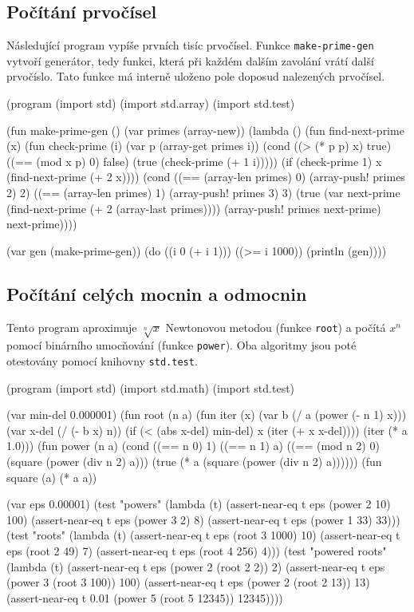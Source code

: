 \subsection{Počítání prvočísel}

Následující program vypíše prvních tisíc prvočísel. Funkce
\texttt{make-prime-gen} vytvoří generátor, tedy funkci, která při každém dalším
zavolání vrátí další prvočíslo. Tato funkce má interně uloženo pole doposud
nalezených prvočísel.

\begin{spiral}
(program
  (import std)
  (import std.array)
  (import std.test)

  (fun make-prime-gen ()
    (var primes (array-new))
    (lambda ()
      (fun find-next-prime (x)
        (fun check-prime (i)
          (var p (array-get primes i))
          (cond
            ((> (* p p) x) true)
            ((== (mod x p) 0) false)
            (true (check-prime (+ 1 i)))))
        (if (check-prime 1) x (find-next-prime (+ 2 x))))
      (cond
        ((== (array-len primes) 0)
          (array-push! primes 2) 2)
        ((== (array-len primes) 1)
          (array-push! primes 3) 3)
        (true 
          (var next-prime (find-next-prime (+ 2 (array-last primes))))
          (array-push! primes next-prime)
          next-prime))))

  (var gen (make-prime-gen))
  (do ((i 0 (+ i 1)))
    ((>= i 1000))
    (println (gen))))
\end{spiral}

\subsection{Počítání celých mocnin a odmocnin}

Tento program aproximuje $\sqrt[n]{x}$ Newtonovou metodou (funkce \texttt{root})
a počítá $x^n$ pomocí binárního umocňování (funkce \texttt{power}). Oba
algoritmy jsou poté otestovány pomocí knihovny \texttt{std.test}.

\begin{spiral}
(program
  (import std)
  (import std.math)
  (import std.test)

  (var min-del 0.000001)
  (fun root (n a)
    (fun iter (x)
      (var b (/ a (power (- n 1) x)))
      (var x-del (/ (- b x) n))
      (if (< (abs x-del) min-del) x (iter (+ x x-del))))
    (iter (* a 1.0)))
  (fun power (n a)
    (cond
      ((== n 0) 1)
      ((== n 1) a)
      ((== (mod n 2) 0) (square (power (div n 2) a)))
      (true (* a (square (power (div n 2) a))))))
  (fun square (a) (* a a))

  (var eps 0.00001)
  (test "powers" (lambda (t) 
    (assert-near-eq t eps (power 2 10) 100)
    (assert-near-eq t eps (power 3 2) 8)
    (assert-near-eq t eps (power 1 33) 33)))
  (test "roots" (lambda (t)
    (assert-near-eq t eps (root 3 1000) 10)
    (assert-near-eq t eps (root 2 49) 7)
    (assert-near-eq t eps (root 4 256) 4)))
  (test "powered roots" (lambda (t)
    (assert-near-eq t eps (power 2 (root 2 2)) 2)
    (assert-near-eq t eps (power 3 (root 3 100)) 100)
    (assert-near-eq t eps (power 2 (root 2 13)) 13)
    (assert-near-eq t 0.01 (power 5 (root 5 12345)) 12345))))
\end{spiral}

